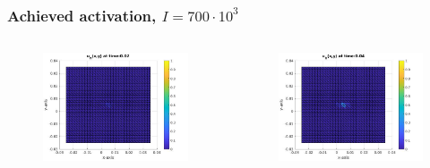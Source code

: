 \documentclass[9pt]{beamer}
\begin{document}
\begin{frame}
	\frametitle{Achieved activation, $I = 700\cdot 10^3$}
	\begin{columns}
		\begin{column}{0.25\textwidth}
			\begin{figure}[h]
				\includegraphics[width=\textwidth]{tc1-2/002.jpg}
			\end{figure}
		\end{column}
		\begin{column}{0.25\textwidth}
			\begin{figure}[h]
				\includegraphics[width=\textwidth]{tc1-2/004.jpg}
			\end{figure}
		\end{column}

\end{columns}
\end{frame}
\end{document}
